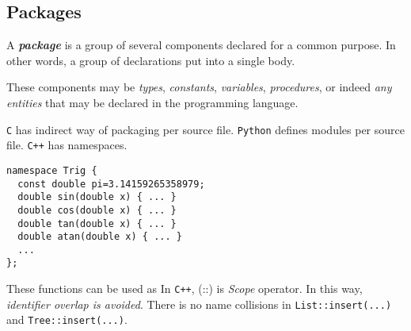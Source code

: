 \subsection{Packages}
\label{subsec:packages}

A \textit{\textbf{package}} is a group of several components declared for a common purpose. In other words, a group of declarations put into a single body.

These components may be \textit{types}, \textit{constants}, \textit{variables}, \textit{procedures}, or indeed \textit{any entities} that may be declared in the programming language.

\vspace*{\fill}
\columnbreak

\texttt{C} has indirect way of packaging per source file. \texttt{Python} defines modules per source file. \texttt{C++} has namespaces.
\begin{listing}[H]
\begin{verbatim}
namespace Trig {
  const double pi=3.14159265358979;
  double sin(double x) { ... }
  double cos(double x) { ... }
  double tan(double x) { ... }
  double atan(double x) { ... }
  ...
};
\end{verbatim}
\caption{}
\label{code:code1}
\end{listing}
\noindent These functions can be used as 
\noindent In \texttt{C++}, (::) is \textit{Scope} operator. In this way, \textit{identifier overlap is avoided}. There is no name collisions in \texttt{List::insert(...)} and \texttt{Tree::insert(...)}.
